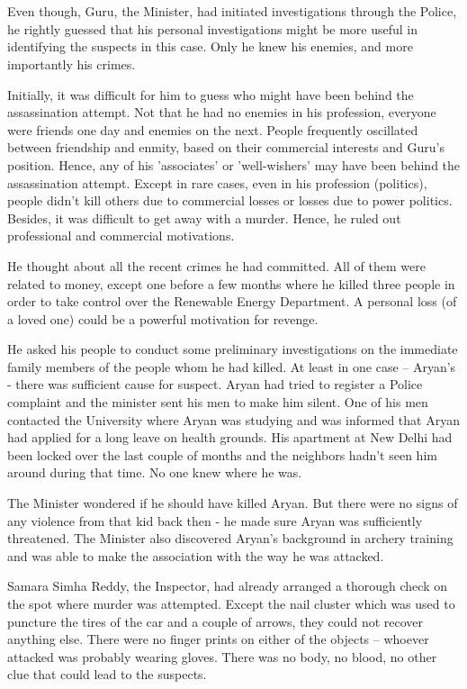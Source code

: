 \chapter{}

Even though, Guru, the Minister, had initiated investigations through the
Police, he rightly guessed that his personal investigations might be more useful
in identifying the suspects in this case. Only he knew his enemies, and more
importantly his crimes.

Initially, it was difficult for him to guess who might have been behind the
assassination attempt. Not that he had no enemies in his profession, everyone
were friends one day and enemies on the next. People frequently oscillated
between friendship and enmity, based on their commercial interests and Guru's
position. Hence, any of his 'associates' or 'well-wishers' may have been behind
the assassination attempt. Except in rare cases, even in his profession
(politics), people didn't kill others due to commercial losses or losses due to
power politics. Besides, it was difficult to get away with a murder. Hence, he
ruled out professional and commercial motivations.

He thought about all the recent crimes he had committed. All of them were
related to money, except one before a few months where he killed three people in
order to take control over the Renewable Energy Department. A personal loss (of
a loved one) could be a powerful motivation for revenge.

He asked his people to conduct some preliminary investigations on the immediate
family members of the people whom he had killed. At least in one case – Aryan's
- there was sufficient cause for suspect. Aryan had tried to register a Police
complaint and the minister sent his men to make him silent. One of his men
contacted the University where Aryan was studying and was informed that Aryan
had applied for a long leave on health grounds. His apartment at New Delhi had
been locked over the last couple of months and the neighbors hadn't seen him
around during that time. No one knew where he was.

The Minister wondered if he should have killed Aryan. But there were no signs of
any violence from that kid back then - he made sure Aryan was sufficiently
threatened. The Minister also discovered Aryan's background in archery training
and was able to make the association with the way he was attacked.

Samara Simha Reddy, the Inspector, had already arranged a thorough check on the
spot where murder was attempted. Except the nail cluster which was used to
puncture the tires of the car and a couple of arrows, they could not recover
anything else. There were no finger prints on either of the objects – whoever
attacked was probably wearing gloves. There was no body, no blood, no other clue
that could lead to the suspects.

